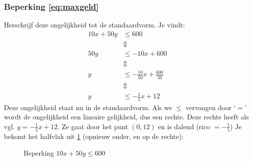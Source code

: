 \subsubsection{Beperking \eqref{eq:maxgeld}}
Herschrijf deze ongelijkheid tot de standaardvorm. Je vindt:
\begin{align*}
    10x+50y &\leqslant 600 \\
     & \Updownarrow   \\
    50y & \leqslant  -10x+600  \\
     & \Updownarrow    \\
    y & \leqslant  -\frac{10}{50}x+\frac{600}{50}  \\
     & \Updownarrow    \\
    y & \leqslant  -\frac{1}{5}x+12
\end{align*}
Deze ongelijkheid staat nu in de standaardvorm. Als we $\leqslant$
vervangen door `$=$' wordt de ongelijkheid een lineaire gelijkheid,
dus een rechte. Deze rechte heeft als vgl. $y=-\frac{1}{5}x+12$.
Ze gaat door het punt $(0,12)$ en is dalend (rico $=-\frac{1}{5}$)
Je bekomt het halfvlak uit \cref{fig:budget} (opnieuw onder, en op de
rechte):
\begin{figure}[tbp]
    \centering
{}
    \caption{Beperking $10x+50y 
    \leqslant 600$}
    \label{fig:budget}
\end{figure}



